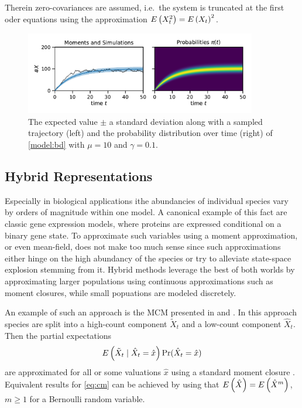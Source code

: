Therein zero-covariances are assumed, i.e.\ the system is truncated
at the first oder equations using the approximation ${E}\left(X_t^2\right)={E}\left(X_t\right)^2$.
\begin{figure}[htb]
  \centering
  \includegraphics[width=0.9\textwidth]{gfx/momsandprobs.pdf}
  \caption[Moments and probability distribution
  $\pi(t)$]{\label{fig:momsandprobs}The expected value $\pm$ a
    standard deviation along with a sampled trajectory (left) and the
    probability distribution over time (right) of \autoref{model:bd}
  with $\mu=10$ and $\gamma=0.1$.}
\end{figure}

\subsection{Hybrid Representations}
Especially in biological applications ithe abundancies of individual
species vary by orders
of magnitude within one model.
A canonical example of this fact are classic gene expression models,
where proteins are expressed
conditional on a binary gene state.
To approximate such variables using a moment approximation, or even
mean-field, does not make too much sense since such approximations
either hinge on the high abundancy of the species or try to alleviate
state-space explosion stemming from it.
Hybrid methods leverage the best of both worlds by approximating
larger populations using continuous approximations such as moment
closures, while small popuations are modeled discretely.

An example of such an approach is the \ac{MCM} presented in
\citet{hasenauer2014method} and \citet{kazeroonian2014modeling}.
In this approach species are split into a high-count component
$\tilde{X}_t$ and a low-count component $\hat{X}_t$.
Then the partial expectations
\begin{equation}\label{eq:cm}
  {E}\left(\tilde{X}_t \mid \hat{X}_t = \hat{x}\right)\Pr({\hat{X}_t=\hat{x}})
\end{equation}
are approximated for all or some valuations $\hat{x}$ using a
standard moment closure \parencite{andreychenko2015reconstruction}.
Equivalent results for \eqref{eq:cm} can be achieved by using that
${E}\left(\hat{X}\right)={E}\left(\hat{X}^m\right)$, $m\geq 1$ for a Bernoulli random variable.

